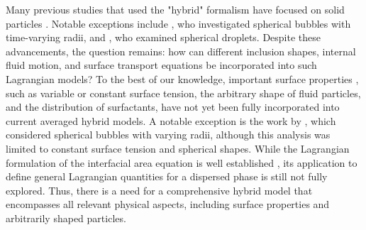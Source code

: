 
Many previous studies that used the "hybrid" formalism have focused on solid particles \citep{buyevich1979flow,jackson1997locally}. 
Notable exceptions include \citet{zhang1994ensemble}, who investigated spherical bubbles with time-varying radii, and \citet{zhang1997momentum}, who examined spherical droplets. 
Despite these advancements, the question remains: how can different inclusion shapes, internal fluid motion, and surface transport equations be incorporated into such Lagrangian models? 
To the best of our knowledge, important surface properties , such as variable or constant surface tension, the arbitrary shape of fluid particles, and the distribution of surfactants, have not yet been fully incorporated into current averaged hybrid models. 
A notable exception is the work by \citep{zhang1994ensemble}, which considered spherical bubbles with varying radii, although this analysis was limited to constant surface tension and spherical shapes. 
While the Lagrangian formulation of the interfacial area equation is well established \citep{lhuillier2000bilan}, its application to define general Lagrangian quantities for a dispersed phase is still not fully explored. 
Thus, there is a need for a comprehensive hybrid model that encompasses all relevant physical aspects, including surface properties and arbitrarily shaped particles.%


